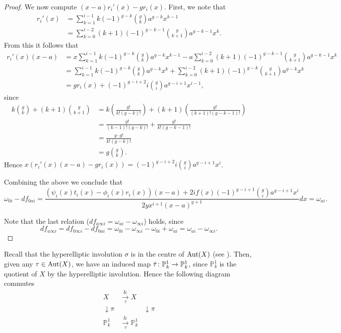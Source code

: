 \begin{proof}
    
    We now compute $(x-a)r_i'(x)-gr_i(x)$.
    First, we note that
        \begin{align*}
        r_i'(x) & = \sum_{k=1}^{i-1} k (-1)^{g-k} \binom{g}{k} a^{g-k} x^{k-1} \\
        & = \sum_{k=0}^{i-2} (k+1) (-1)^{g-k-1} \binom{g}{k+1}a^{g-k-1} x^k.
        \end{align*}
    From this it follows that
        \begin{align*}
        r_i'(x)(x-a) & = x \sum_{k=1}^{i-1} k (-1)^{g-k} \binom{g}{k} a^{g-k} x^{k-1} - a \sum_{k=0}^{i-2} (k+1) (-1)^{g-k-1} \binom{g}{k+1}a^{g-k-1} x^k \\
        & = \sum_{k=1}^{i-1} k (-1)^{g-k} \binom{g}{k} a^{g-k} x^k  + \sum_{k=0}^{i-2} (k+1) (-1)^{g-k} \binom{g}{k+1}a^{g-k} x^k \\
        & = gr_i(x) + (-1)^{g-i+2}i \binom{g}{i}a^{g-i+1}x^{i-1},
        \end{align*}
    since
        \begin{align*}
        k\binom{g}{k} + (k+1)\binom{g}{k+1} & = k \left( \frac{g!}{k!(g-k)!} \right) + (k+1) \left( \frac{g!}{(k+1)!(g-k-1)!} \right) \\
        & = \frac{g!}{(k-1)!(g-k)!} + \frac{g!}{k!(g-k-1)!} \\
        & = \frac{g\cdot g!}{k!(g-k)!} \\
        & = g \binom{g}{k}.
        \end{align*}
    Hence $x(r_i'(x)(x-a)-gr_i(x))= (-1)^{g-i+2}i\binom{g}{i} a^{g-i+1}x^i$.
    
    Combining the above we conclude that
        \[
        \omega_{0 i } - df_{0a i} =  \frac{(\psi_i(x)t_i(x) - \phi_i(x)r_i(x))(x-a) + 2if(x)(-1)^{g-i+1}\binom{g}{i} a^{g-i+1}x^i}{2yx^{i+1}(x-a)^{g+1}}dx= \omega_{a i}.
        \]
    
    Note that the last relation ($df_{a \infty i} = \omega_{a i} - \omega_{\infty i}$) holds, since 
        \[
        df_{a \infty i} = df_{0 \infty i} - df_{0 a i} = \omega_{0 i} - \omega_{\infty i } - \omega_{0 i} + \omega_{a i} = \omega_{a i} - \omega_{\infty i}.
        \]
    \end{proof}
Recall that the hyperelliptic involution $\sigma$ is in the centre of $\operatorname{Aut}(X)$ (see \cite[Cor.\ 7.4.31]{liu}).
Then, given any $\tau \in \operatorname{Aut}(X)$, we have an induced map $\bar \tau \colon \mathbb{P}_k^1 \rightarrow \mathbb{P}_k^1$, since $\mathbb {P}_k^1$ is the quotient of $X$ by the hyperelliptic involution.
Hence the following diagram commutes 
    \[
    \begin{array}{ccc}
    X & \xrightarrow[\tau] & X \\
    \downarrow\pi & & \downarrow\pi \\
    \mathbb P^1_k & \xrightarrow[\tau] & \mathbb P_k^1
    \end{array}
    \]
